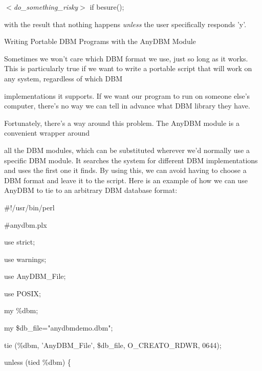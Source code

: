 \documentclass[a4paper,11pt]{book}
\begin{document}
\noindent 

\noindent \textit{$<$do\_something\_risky$>$ }if besure();

\noindent 

\noindent with the result that nothing happens \textit{unless }the user specifically responds 'y'.

\noindent 

\noindent Writing Portable DBM Programs with the AnyDBM Module

\noindent 

\noindent Sometimes we won't care which DBM format we use, just so long as it works. This is particularly true if we want to write a portable script that will work on any system, regardless of which DBM

\noindent implementations it supports. If we want our program to run on someone else's computer, there's no way we can tell in advance what DBM library they have.

\noindent 

\noindent Fortunately, there's a way around this problem. The AnyDBM module is a convenient wrapper around

\noindent all the DBM modules, which can be substituted wherever we'd normally use a specific DBM module. It searches the system for different DBM implementations and uses the first one it finds. By using this, we can avoid having to choose a DBM format and leave it to the script. Here is an example of how we can use AnyDBM to tie to an arbitrary DBM database format:

\noindent 

\noindent 

\noindent \#!/usr/bin/perl

\noindent \#anydbm.plx

\noindent use strict;

\noindent use warnings;

\noindent use AnyDBM\_File;

\noindent use POSIX;

\noindent 

\noindent my \%dbm;

\noindent my \$db\_file="anydbmdemo.dbm";

\noindent 

\noindent tie (\%dbm, 'AnyDBM\_File', \$db\_file, O\_CREAT\textbar O\_RDWR, 0644);

\noindent 

\noindent 

\noindent unless (tied \%dbm) \{
\end{document}
